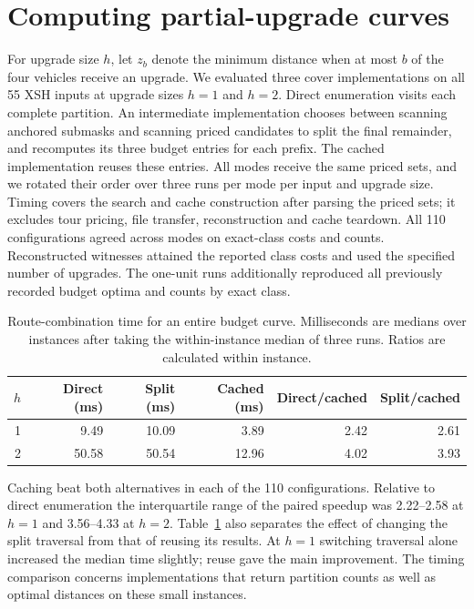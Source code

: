 \documentclass[runningheads]{llncs}
\begin{document}
\section{Computing partial-upgrade curves} For upgrade size $h$, let $z_b$ denote the minimum distance when at most $b$ of the four vehicles receive an upgrade.
We evaluated three cover implementations on all 55 XSH inputs at upgrade sizes $h=1$ and $h=2$. Direct enumeration visits each complete partition. An intermediate implementation chooses between scanning anchored submasks and scanning priced candidates to split the final remainder, and recomputes its three budget entries for each prefix. The cached implementation reuses these entries. All modes receive the same priced sets, and we rotated their order over three runs per mode per input and upgrade size. Timing covers the search and cache construction after parsing the priced sets; it excludes tour pricing, file transfer, reconstruction and cache teardown. All 110 configurations agreed across modes on exact-class costs and counts. Reconstructed witnesses attained the reported class costs and used the specified number of upgrades. The one-unit runs additionally reproduced all previously recorded budget optima and counts by exact class.

\begin{table}[tb]\centering
\caption{Route-combination time for an entire budget curve. Milliseconds are medians over instances after taking the within-instance median of three runs. Ratios are calculated within instance.}\label{tab:profiles}
\begin{tabular}{rrrrrr}\toprule
$h$ & Direct (ms) & Split (ms) & Cached (ms) & Direct/cached & Split/cached\\\midrule
1 & 9.49 & 10.09 & 3.89 & 2.42 & 2.61\\
2 & 50.58 & 50.54 & 12.96 & 4.02 & 3.93\\\bottomrule
\end{tabular}
\end{table}

Caching beat both alternatives in each of the 110 configurations. Relative to direct enumeration the interquartile range of the paired speedup was 2.22--2.58 at $h=1$ and 3.56--4.33 at $h=2$. Table~\ref{tab:profiles} also separates the effect of changing the split traversal from that of reusing its results. At $h=1$ switching traversal alone increased the median time slightly; reuse gave the main improvement. The timing comparison concerns implementations that return partition counts as well as optimal distances on these small instances.
\end{document}
